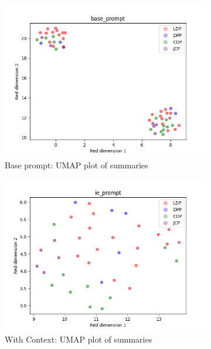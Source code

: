 \documentclass[final,5p,times,twocolumn,authoryear]{elsarticle}
\begin{document}
\begin{figure}[h]
\centering
\begin{subfigure}{0.22\textwidth}
  \centering
  \includegraphics[width=1\linewidth]{figs/base_prompt_umap.png}
  \caption{Base prompt: UMAP plot of summaries}
\end{subfigure}
\begin{subfigure}{0.22\textwidth}
  \centering
  \includegraphics[width=1\linewidth]{figs/ie_prompt_umap.png}
  \caption{With Context: UMAP plot of summaries}
\end{subfigure}
\begin{subfigure}{0.22\textwidth}
  \centering

\end{subfigure}
\end{figure}
\end{document}
